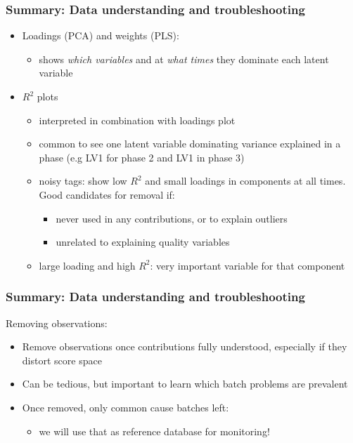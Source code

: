 \begin{frame}\frametitle{Summary: Data understanding and troubleshooting}
	
\begin{itemize}
	\item	Loadings (PCA) and weights (PLS):
	
			\begin{itemize}
				\item	shows \emph{which variables} and at \emph{what times} they dominate each latent variable
				
			\end{itemize}


	\item 	\( R^2 \) plots
		
			\begin{itemize}
				\item	interpreted in combination with loadings plot
				
				\item	common to see one latent variable dominating variance explained in a phase (e.g LV1 for phase 2 and LV1 in phase 3)
				
				\item	noisy tags: show low \( R^2  \) and small loadings in components at all times.  Good candidates for removal if:
				 		
						\begin{itemize}
							\item	never used in any contributions, or to explain outliers
							
							\item	unrelated to explaining quality variables
						\end{itemize}
				
				\item	large loading and high \( R^2 \): very important variable for that component
			\end{itemize}

\end{itemize}

\end{frame}

\begin{frame}\frametitle{Summary: Data understanding and troubleshooting}

Removing observations:	
\begin{itemize}
	\item	Remove observations once contributions fully understood, especially if they distort score space
	
	\item	Can be tedious, but important to learn which batch problems are prevalent
	
	\item	Once removed, only common cause batches left:
	
			\begin{itemize}
				\item	we will use that as reference database for monitoring!
			\end{itemize}

\end{itemize}

\end{frame}